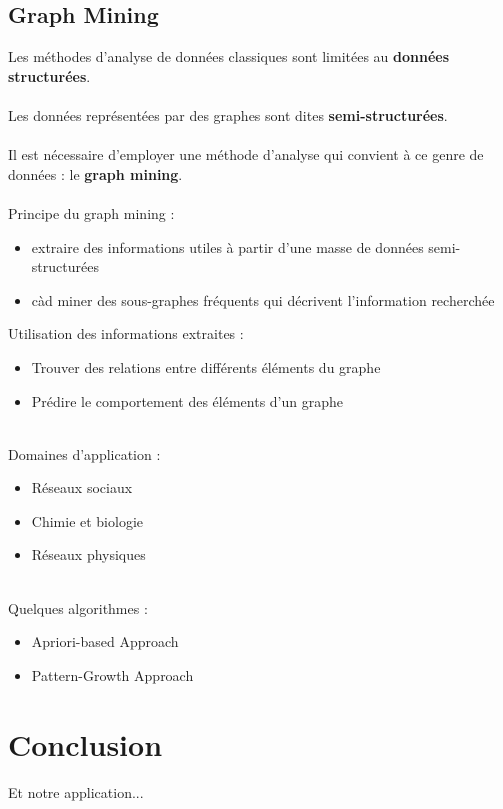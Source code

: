 	\subsection{Graph Mining}
	\begin{frame}
		Les méthodes d'analyse de données classiques sont limitées au \textbf{données structurées}.
		\\~\\
		\pause
		Les données représentées par des graphes sont dites \textbf{semi-structurées}.
		\\~\\
		\pause
		Il est nécessaire d'employer une méthode d'analyse qui convient à ce genre de données : le \textbf{graph mining}.
		\\~\\
		\pause
		Principe du graph mining :
		\begin{itemize} 
		\pause \item extraire des informations utiles à partir d'une masse de données semi-structurées
		\pause \item càd miner des sous-graphes fréquents qui décrivent l'information recherchée
		\end{itemize}
	\end{frame}
	\begin{frame}
		Utilisation des informations extraites :
		\begin{itemize}
			\pause \item Trouver des relations entre différents éléments du graphe
			\pause \item Prédire le comportement des éléments d'un graphe
		\end{itemize}
		~\\
		\pause
		Domaines d'application :
		\begin{itemize}
			\pause \item Réseaux sociaux
			\pause \item Chimie et biologie
			\pause \item Réseaux physiques
		\end{itemize}
		~\\
		\pause
		Quelques algorithmes :
		\begin{itemize}
			\pause \item Apriori-based Approach
			\pause \item Pattern-Growth Approach
		\end{itemize}
	\end{frame}
	
	\section{Conclusion}
	\begin{frame}
		Et notre application...
	\end{frame}


